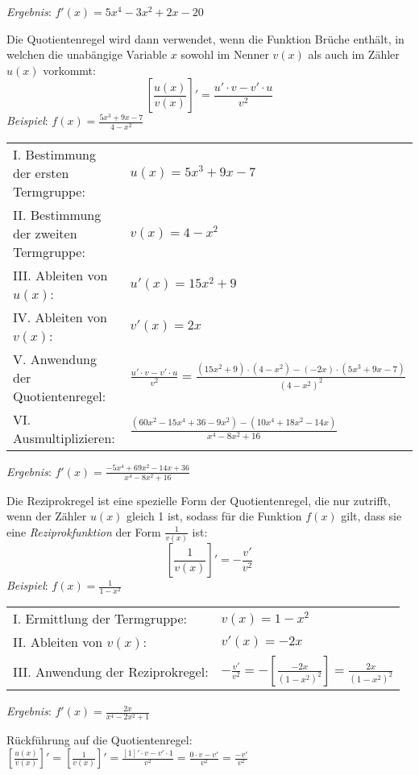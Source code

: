 \emph{Ergebnis}: $f'(x) = 5x^4 - 3x^2 + 2x - 20$

\pagebreak


Die Quotientenregel wird dann verwendet, wenn die Funktion Br\"{u}che enth\"{a}lt, in welchen die unab\"{a}ngige Variable $x$ sowohl im Nenner $v(x)$ als auch im Z\"{a}hler $u(x)$ vorkommt: $$\left[\frac{u(x)}{v(x)}\right]' = \frac{u' \cdot v - v' \cdot u}{v^2}$$
\emph{Beispiel}: $f(x) = \frac{5x^3 + 9x - 7}{4-x^2}$

\begin{tabular}{l l}
	I. Bestimmung der ersten Termgruppe: & $u(x) = 5x^3 + 9x - 7$
	\extrapar \\
	II. Bestimmung der zweiten Termgruppe: & $v(x) = 4 - x^2$
	\extrapar \\
	III. Ableiten von $u(x)$: & $u'(x) = 15x^2 + 9$
	\extrapar \\
	IV. Ableiten von $v(x)$: & $v'(x) = 2x$
	\extrapar \\
	V. Anwendung der Quotientenregel: & $\frac{u' \cdot v - v' \cdot u}{v^2} = \frac{(15x^2 + 9) \cdot (4-x^2) - (-2x) \cdot (5x^3 + 9x - 7)}{(4-x^2)^2}$
	\extrapar \\
	VI. Ausmultiplizieren: & $\frac{(60x^2 - 15x^4 + 36 - 9x^2) - (10x^4 + 18x^2 - 14x)}{x^4 - 8x^2 + 16}$
\end{tabular}

\emph{Ergebnis}: $f'(x) = \frac{-5x^4 + 69x^2 - 14x + 36}{x^4 - 8x^2 + 16}$


Die Reziprokregel ist eine spezielle Form der Quotientenregel, die nur zutrifft, wenn der Z\"{a}hler $u(x)$ gleich 1 ist, sodass f\"{u}r die Funktion $f(x)$ gilt, dass sie eine \emph{Reziprokfunktion} der Form $\frac{1}{v(x)}$ ist: $$\left[\frac{1}{v(x)}\right]' = -\frac{v'}{v^2}$$
\emph{Beispiel}: $f(x) = \frac{1}{1 - x^2}$

\begin{tabular}{l l}
	I. Ermittlung der Termgruppe: & $v(x) = 1 - x^2$
	\extrapar \\
	II. Ableiten von $v(x)$: & $v'(x) = -2x$
	\extrapar \\
	III. Anwendung der Reziprokregel: & $-\frac{v'}{v^2} = -\left[\frac{-2x}{(1-x^2)^2}\right] = \frac{2x}{(1-x^2)^2}$
\end{tabular}

\emph{Ergebnis}: $f'(x) = \frac{2x}{x^4 - 2x^2 + 1}$

R\"{u}ckf\"{u}hrung auf die Quotientenregel: \hspace{1cm} $\left[\frac{u(x)}{v(x)}\right]' = \left[\frac{1}{v(x)}\right]' = \frac{[1]' \cdot v - v' \cdot 1}{v^2} = \frac{0 \cdot v - v'}{v^2} = \frac{-v'}{v^2}$

